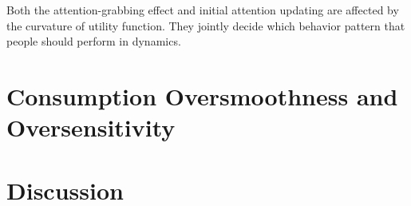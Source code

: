 \documentclass[
  12pt,
]{article}
\begin{document}
Both the attention-grabbing effect and initial attention updating are
affected by the curvature of utility function. They jointly decide which
behavior pattern that people should perform in dynamics.

\hypertarget{consumption-oversmoothness-and-oversensitivity}{%
\section{Consumption Oversmoothness and
Oversensitivity}\label{consumption-oversmoothness-and-oversensitivity}}

\hypertarget{discussion}{%
\section{Discussion}\label{discussion}}

\renewcommand\refname{Reference}
  
\end{document}
